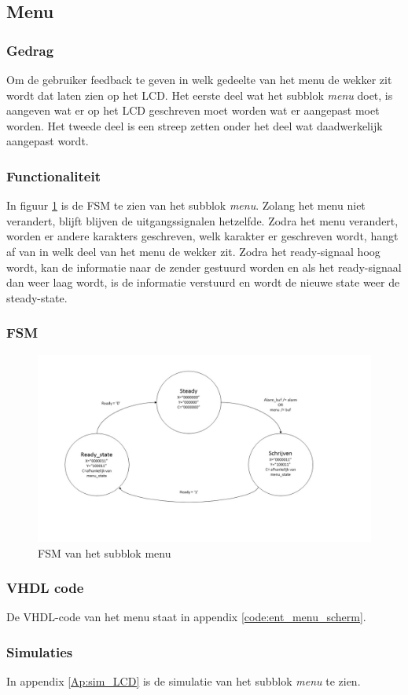\subsection{Menu}

\subsubsection{Gedrag}
Om de gebruiker feedback te geven in welk gedeelte van het menu de wekker zit wordt dat laten zien op het LCD. Het eerste deel wat het subblok \emph{menu} doet, is aangeven wat er op het LCD geschreven moet worden wat er aangepast moet worden. Het tweede deel is een streep zetten onder het deel wat daadwerkelijk aangepast wordt.

\subsubsection{Functionaliteit}
In figuur \ref{fig:FSMmenu} is de FSM te zien van het subblok \emph{menu}. Zolang het menu niet verandert, blijft blijven de uitgangssignalen hetzelfde. Zodra het menu verandert, worden er andere karakters geschreven, welk karakter er geschreven wordt, hangt af van in welk deel van het menu de wekker zit. Zodra het ready-signaal hoog wordt, kan de informatie naar de zender gestuurd worden en als het ready-signaal dan weer laag wordt, is de informatie verstuurd en wordt de nieuwe state weer de steady-state.

\subsubsection{FSM}

\begin{figure}[h!]
\includegraphics[width=15cm]{verslagschemas/FSMs/menu.jpg}
\caption{FSM van het subblok menu}
\label{fig:FSMmenu}
\end{figure}


\subsubsection{VHDL code}
De VHDL-code van het menu staat in appendix \ref{code:ent_menu_scherm}.

\subsubsection{Simulaties}
In appendix \ref{Ap:sim_LCD} is de simulatie van het subblok \emph{menu} te zien.
